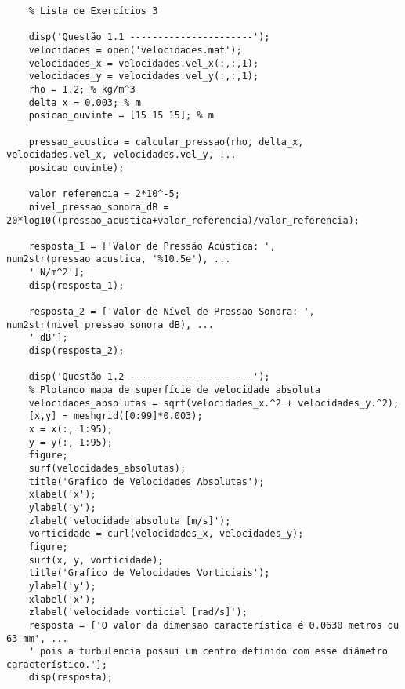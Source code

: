 \begin{enumerate}
\begin{lstlisting}
	% Lista de Exercícios 3

	disp('Questão 1.1 ----------------------');
	velocidades = open('velocidades.mat');
	velocidades_x = velocidades.vel_x(:,:,1);
	velocidades_y = velocidades.vel_y(:,:,1);
	rho = 1.2; % kg/m^3
	delta_x = 0.003; % m
	posicao_ouvinte = [15 15 15]; % m

	pressao_acustica = calcular_pressao(rho, delta_x, velocidades.vel_x, velocidades.vel_y, ...
	posicao_ouvinte);

	valor_referencia = 2*10^-5;
	nivel_pressao_sonora_dB = 20*log10((pressao_acustica+valor_referencia)/valor_referencia);

	resposta_1 = ['Valor de Pressão Acústica: ', num2str(pressao_acustica, '%10.5e'), ...
	' N/m^2'];
	disp(resposta_1);

	resposta_2 = ['Valor de Nível de Pressao Sonora: ', num2str(nivel_pressao_sonora_dB), ...
	' dB'];
	disp(resposta_2);

	disp('Questão 1.2 ----------------------');
	% Plotando mapa de superfície de velocidade absoluta
	velocidades_absolutas = sqrt(velocidades_x.^2 + velocidades_y.^2);
	[x,y] = meshgrid([0:99]*0.003);
	x = x(:, 1:95);
	y = y(:, 1:95);
	figure;
	surf(velocidades_absolutas);
	title('Grafico de Velocidades Absolutas');
	xlabel('x');
	ylabel('y');
	zlabel('velocidade absoluta [m/s]');
	vorticidade = curl(velocidades_x, velocidades_y);
	figure;
	surf(x, y, vorticidade);
	title('Grafico de Velocidades Vorticiais');
	ylabel('y');
	xlabel('x');
	zlabel('velocidade vorticial [rad/s]');
	resposta = ['O valor da dimensao característica é 0.0630 metros ou 63 mm', ...
	' pois a turbulencia possui um centro definido com esse diâmetro característico.'];
	disp(resposta);	


\end{lstlisting}
\end{enumerate}
